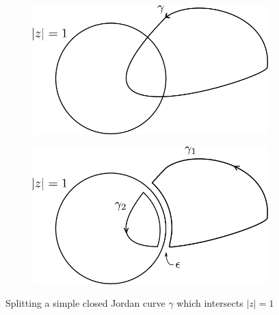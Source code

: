 \begin{solution}
    \begin{figure}[h]
        \centering
        \begin{subfigure}{0.45\textwidth}
            \includegraphics*[width=\textwidth]{problem_12_full_curve.png}
        \end{subfigure}
        \hspace{1.0em}
        \begin{subfigure}{0.45\textwidth}
            \includegraphics*[width=\textwidth]{problem_12_split_curve.png}
        \end{subfigure}
        \caption{Splitting a simple closed Jordan curve $\gamma$ which intersects $|z| = 1$}
        \label{fig:problem_12}
    \end{figure}

    \ \\
\end{solution}